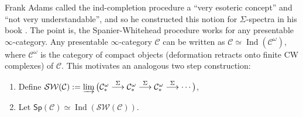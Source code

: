 Frank Adams called the ind-completion procedure a ``very esoteric concept'' and ``not very understandable'', and so he constructed this notion for $\Sigma$-spectra in his book \cite{adams}. The point is, the Spanier-Whitehead procedure works for any presentable $\infty$-category. Any presentable $\infty$-category $\mathcal{C} $ can be written as $\mathcal{C} \simeq \operatorname{Ind}(\mathcal{C} ^{\omega})$, where $\mathcal{C} ^{\omega}$ is the category of compact objects (deformation retracts onto finite CW complexes) of $\mathcal{C} $. This motivates an analogous two step construction:
\begin{enumerate}[label=(\arabic*)]
\setlength\itemsep{-.2em}
    \item Define $\mathcal{SW} (\mathcal{C} ):= \varinjlim \big( \mathcal{C} _*^{\omega}\overset{\Sigma}{\longrightarrow} \mathcal{C} _*^{\omega}\overset{\Sigma}{\longrightarrow}\mathcal{C} _*^{\omega}\overset{\Sigma}{\longrightarrow}\cdots \big)$,
    \item Let $\mathsf{Sp} (\mathcal{C} )\simeq  \operatorname{Ind}(\mathcal{SW} (\mathcal{C} ))$.
\end{enumerate}
